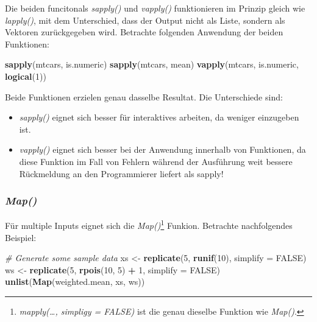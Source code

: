 \documentclass[]{article}
\newenvironment{Shaded}{\begin{snugshade}}{\end{snugshade}}
\newcommand{\KeywordTok}[1]{\textcolor[rgb]{0.13,0.29,0.53}{\textbf{#1}}}
\newcommand{\DataTypeTok}[1]{\textcolor[rgb]{0.13,0.29,0.53}{#1}}
\newcommand{\DecValTok}[1]{\textcolor[rgb]{0.00,0.00,0.81}{#1}}
\newcommand{\StringTok}[1]{\textcolor[rgb]{0.31,0.60,0.02}{#1}}
\newcommand{\CommentTok}[1]{\textcolor[rgb]{0.56,0.35,0.01}{\textit{#1}}}
\newcommand{\OtherTok}[1]{\textcolor[rgb]{0.56,0.35,0.01}{#1}}
\newcommand{\OperatorTok}[1]{\textcolor[rgb]{0.81,0.36,0.00}{\textbf{#1}}}
\newcommand{\NormalTok}[1]{#1}
\providecommand{\tightlist}{%
  \setlength{\itemsep}{0pt}\setlength{\parskip}{0pt}}
\let\rmarkdownfootnote\footnote%
\def\footnote{\protect\rmarkdownfootnote}
\begin{document}
Die beiden funcitonals \emph{sapply()} und \emph{vapply()} funktionieren
im Prinzip gleich wie \emph{lapply()}, mit dem Unterschied, dass der
Output nicht als Liste, sondern als Vektoren zurückgegeben wird.
Betrachte folgenden Anwendung der beiden Funktionen:

\begin{Shaded}
\begin{Highlighting}[]
\KeywordTok{sapply}\NormalTok{(mtcars, is.numeric)}
\KeywordTok{sapply}\NormalTok{(mtcars, mean)}
\KeywordTok{vapply}\NormalTok{(mtcars, is.numeric, }\KeywordTok{logical}\NormalTok{(}\DecValTok{1}\NormalTok{))}
\end{Highlighting}
\end{Shaded}

Beide Funktionen erzielen genau dasselbe Resultat. Die Unterschiede
sind:

\begin{itemize}
\tightlist
\item
  \emph{sapply()} eignet sich besser für interaktives arbeiten, da
  weniger einzugeben ist.
\item
  \emph{vapply()} eignet sich besser bei der Anwendung innerhalb von
  Funktionen, da diese Funktion im Fall von Fehlern während der
  Ausführung weit bessere Rückmeldung an den Programmierer liefert als
  sapply!
\end{itemize}

\subsubsection*{\texorpdfstring{\emph{Map()}}{Map()}}\label{map}

Für multiple Inputs eignet sich die \emph{Map()}\footnote{\emph{mapply(\ldots{},
  simpligy = FALSE)} ist die genau dieselbe Funktion wie \emph{Map()}.}
Funkion. Betrachte nachfolgendes Beispiel:

\begin{Shaded}
\begin{Highlighting}[]
  \CommentTok{# Generate some sample data}
\NormalTok{  xs <-}\StringTok{ }\KeywordTok{replicate}\NormalTok{(}\DecValTok{5}\NormalTok{, }\KeywordTok{runif}\NormalTok{(}\DecValTok{10}\NormalTok{), }\DataTypeTok{simplify =} \OtherTok{FALSE}\NormalTok{)}
\NormalTok{  ws <-}\StringTok{ }\KeywordTok{replicate}\NormalTok{(}\DecValTok{5}\NormalTok{, }\KeywordTok{rpois}\NormalTok{(}\DecValTok{10}\NormalTok{, }\DecValTok{5}\NormalTok{) }\OperatorTok{+}\StringTok{ }\DecValTok{1}\NormalTok{, }\DataTypeTok{simplify =} \OtherTok{FALSE}\NormalTok{)}
  \KeywordTok{unlist}\NormalTok{(}\KeywordTok{Map}\NormalTok{(weighted.mean, xs, ws))}
\end{Highlighting}
\end{Shaded}
\end{document}
